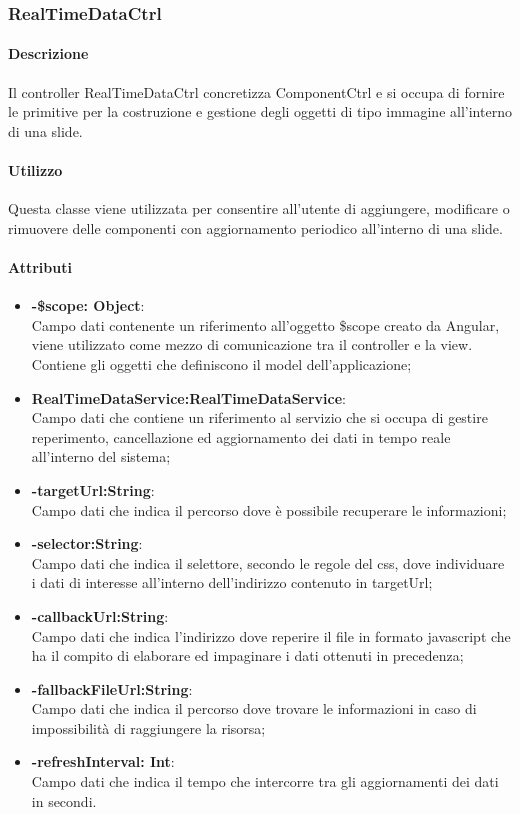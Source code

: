 \newpage
\subsubsection{RealTimeDataCtrl}
   \paragraph{Descrizione}
	Il controller RealTimeDataCtrl concretizza ComponentCtrl e si occupa di fornire le primitive per la costruzione e gestione degli oggetti di tipo immagine all'interno di una slide.
		
	\paragraph{Utilizzo}
	Questa classe viene utilizzata per consentire all'utente di aggiungere, modificare o rimuovere delle componenti con aggiornamento periodico all'interno di una slide.
	
	\paragraph{Attributi}
	\begin{itemize}
		\item \textbf{-\$scope: Object}:\\
			Campo dati contenente un riferimento all'oggetto \$scope creato da Angular, viene utilizzato come mezzo di comunicazione tra il controller e la view. Contiene gli oggetti che definiscono il model dell'applicazione;
		\item \textbf{RealTimeDataService:RealTimeDataService}:\\
			Campo dati che contiene un riferimento al servizio che si occupa di gestire reperimento, cancellazione ed aggiornamento dei dati in tempo reale all'interno del sistema;
		\item \textbf{-targetUrl:String}:\\
			Campo dati che indica il percorso dove è possibile recuperare le informazioni;
		\item \textbf{-selector:String}:\\
			Campo dati che indica il selettore, secondo le regole del css, dove individuare i dati di interesse all'interno dell'indirizzo contenuto in targetUrl;
		\item \textbf{-callbackUrl:String}:\\
			Campo dati che indica l'indirizzo dove reperire il file in formato javascript che ha il compito di elaborare ed impaginare i dati ottenuti in precedenza;
		\item \textbf{-fallbackFileUrl:String}:\\
			Campo dati che indica il percorso dove trovare le informazioni in caso di impossibilità di raggiungere la risorsa;
		\item \textbf{-refreshInterval: Int}:\\
			Campo dati che indica il tempo che intercorre tra gli aggiornamenti dei dati in secondi.
			
	\end{itemize}
	
